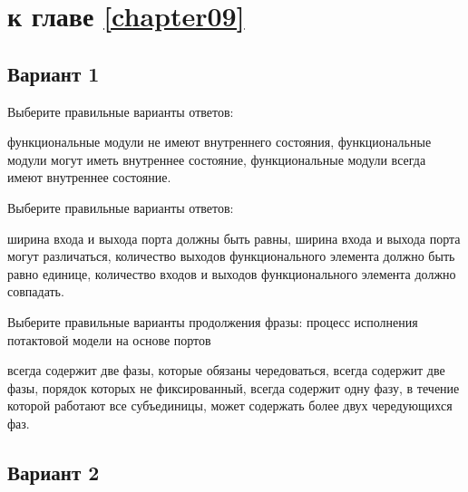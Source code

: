 \section{\Questions к главе \ref{chapter09}} %

\subsection*{Вариант 1}

\begin{questions}

\question[3] Выберите правильные варианты ответов:
\begin{choices}
    \correctchoice функциональные модули не имеют внутреннего состояния,
    \choice функциональные модули могут иметь внутреннее состояние,
    \choice функциональные модули всегда имеют внутреннее состояние.
\end{choices}
    
    
\question[3] Выберите правильные варианты ответов:
\begin{choices}
    \correctchoice ширина входа и выхода порта должны быть равны,
    \choice ширина входа и выхода порта могут различаться,
    \choice количество выходов функционального элемента должно быть равно единице,
    \choice количество входов и выходов функционального элемента должно совпадать.
\end{choices}
    
\question[3] Выберите правильные варианты продолжения фразы: процесс исполнения потактовой модели на основе портов 
\begin{choices}
    \correctchoice всегда содержит две фазы, которые обязаны чередоваться,
    \choice всегда содержит две фазы, порядок которых не фиксированный,
    \choice всегда содержит одну фазу, в течение которой работают все субъединицы,
    \choice может содержать более двух чередующихся фаз.
\end{choices}



\end{questions}

\subsection*{Вариант 2}

